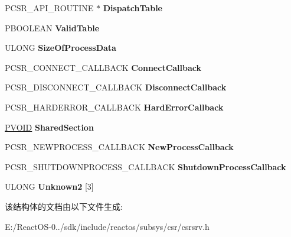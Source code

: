 \begin{DoxyCompactItemize}
\mbox{\label{struct___c_s_r___s_e_r_v_e_r___d_l_l_a877ce0b961860851c56aa108e9caad60}} 
P\+C\+S\+R\+\_\+\+A\+P\+I\+\_\+\+R\+O\+U\+T\+I\+NE $\ast$ {\bfseries Dispatch\+Table}
\item 
\mbox{\label{struct___c_s_r___s_e_r_v_e_r___d_l_l_a2d43da6d3dddc951527f60f4418afce5}} 
P\+B\+O\+O\+L\+E\+AN {\bfseries Valid\+Table}
\item 
\mbox{\label{struct___c_s_r___s_e_r_v_e_r___d_l_l_ae6cc5536f565784c65fe88d83347369b}} 
U\+L\+O\+NG {\bfseries Size\+Of\+Process\+Data}
\item 
\mbox{\label{struct___c_s_r___s_e_r_v_e_r___d_l_l_afbe5227a88b947567dd031d81179541b}} 
P\+C\+S\+R\+\_\+\+C\+O\+N\+N\+E\+C\+T\+\_\+\+C\+A\+L\+L\+B\+A\+CK {\bfseries Connect\+Callback}
\item 
\mbox{\label{struct___c_s_r___s_e_r_v_e_r___d_l_l_a6ec83bcd485ff530feb84c366b83fe7a}} 
P\+C\+S\+R\+\_\+\+D\+I\+S\+C\+O\+N\+N\+E\+C\+T\+\_\+\+C\+A\+L\+L\+B\+A\+CK {\bfseries Disconnect\+Callback}
\item 
\mbox{\label{struct___c_s_r___s_e_r_v_e_r___d_l_l_a10665f59f32be770a37f0dd0afc7c2a1}} 
P\+C\+S\+R\+\_\+\+H\+A\+R\+D\+E\+R\+R\+O\+R\+\_\+\+C\+A\+L\+L\+B\+A\+CK {\bfseries Hard\+Error\+Callback}
\item 
\mbox{\label{struct___c_s_r___s_e_r_v_e_r___d_l_l_a83ebb235e258490715c62eb37bee17e9}} 
\hyperlink{interfacevoid}{P\+V\+O\+ID} {\bfseries Shared\+Section}
\item 
\mbox{\label{struct___c_s_r___s_e_r_v_e_r___d_l_l_a7f153b6c59a996432fc657bbca2c6bac}} 
P\+C\+S\+R\+\_\+\+N\+E\+W\+P\+R\+O\+C\+E\+S\+S\+\_\+\+C\+A\+L\+L\+B\+A\+CK {\bfseries New\+Process\+Callback}
\item 
\mbox{\label{struct___c_s_r___s_e_r_v_e_r___d_l_l_a9e677047651bc38fce1c7fcfedb0d12b}} 
P\+C\+S\+R\+\_\+\+S\+H\+U\+T\+D\+O\+W\+N\+P\+R\+O\+C\+E\+S\+S\+\_\+\+C\+A\+L\+L\+B\+A\+CK {\bfseries Shutdown\+Process\+Callback}
\item 
\mbox{\label{struct___c_s_r___s_e_r_v_e_r___d_l_l_a2ee730cc0357ad54ecc2f7f477461591}} 
U\+L\+O\+NG {\bfseries Unknown2} \mbox{[}3\mbox{]}
\end{DoxyCompactItemize}


该结构体的文档由以下文件生成\+:\begin{DoxyCompactItemize}
\item 
E\+:/\+React\+O\+S-\/0../sdk/include/reactos/subsys/csr/csrsrv.\+h\end{DoxyCompactItemize}
